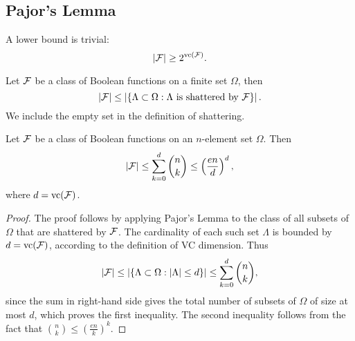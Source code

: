 \begin{example}

\end{example}

\begin{remark}

\end{remark}

\subsection{Pajor's Lemma}

A lower bound is trivial:
\begin{equation*}
	|\mathcal{F}|\geq 2^{\text{vc}(\mathcal{F})}.
\end{equation*}

\begin{lemma}
	Let \(\mathcal{F}\) be a class of Boolean functions on a finite set \(\Omega\), then
	\begin{equation*}
		|\mathcal{F}|\leq\left|\left\{\Lambda\subset\Omega:\Lambda\text{ is shattered by }\mathcal{F}\right\}\right|.
	\end{equation*}
	We include the empty set in the definition of shattering.
\end{lemma}

\begin{theorem}
	Let \(\mathcal{F}\) be a class of Boolean functions on an \(n\)-element set \(\Omega\). Then
	\begin{equation*}
		|\mathcal{F}|\leq\sum_{k=0}^{d}\binom{n}{k}\leq\left(\frac{en}{d}\right)^{d},
	\end{equation*}
	where \(d=\text{vc}(\mathcal{F})\).
\end{theorem}

\begin{proof}
	The proof follows by applying Pajor's Lemma to the class of all subsets of \(\Omega\) that are shattered by \(\mathcal{F}\). The cardinality of each such set \(\Lambda\) is bounded by \(d=\text{vc}(\mathcal{F})\), according to the definition of VC dimension. Thus
	\begin{equation*}
		|\mathcal{F}|\leq\left|\left\{\Lambda\subset\Omega:|\Lambda|\leq d\right\}\right|\leq\sum_{k=0}^{d}\binom{n}{k},
	\end{equation*}
	since the sum in right-hand side gives the total number of subsets of \(\Omega\) of size at most \(d\), which proves the first inequality. The second inequality follows from the fact that \(\binom{n}{k}\leq\left(\frac{en}{k}\right)^{k}\).
\end{proof}

